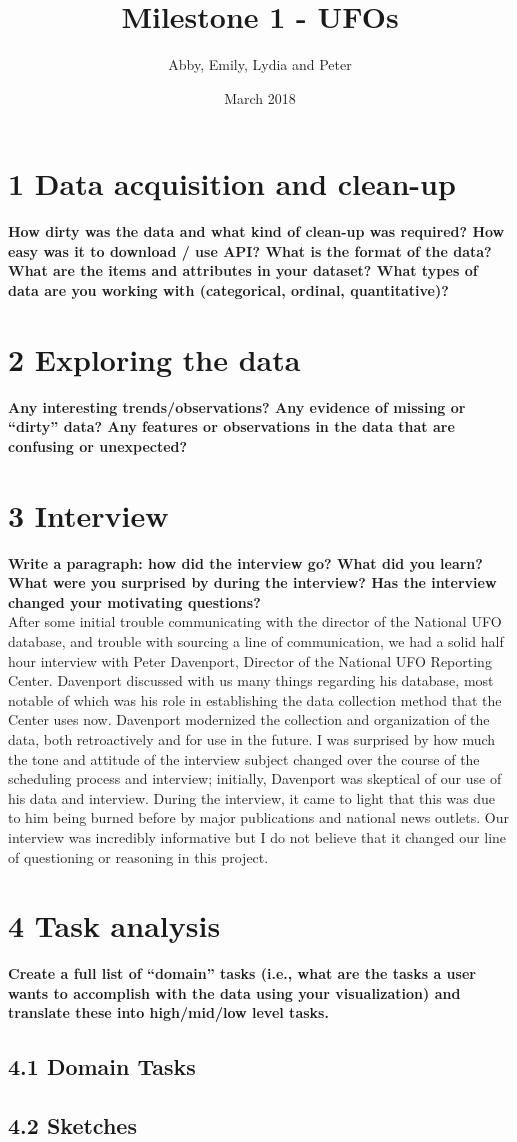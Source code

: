 \documentclass{neu_handout}
\title{Milestone 1 - UFOs}
\author{Abby, Emily, Lydia and Peter}
\date{March 2018}
\begin{document}
\section*{1 Data acquisition and clean-up}

\textbf{How dirty was the data and what kind of clean-up was required? How
easy was it to download / use API? What is the format of the data? What are the
items and attributes in your dataset? What types of data are you working with
(categorical, ordinal, quantitative)?}\\


\section*{2 Exploring the data}

\textbf{Any interesting
trends/observations? Any evidence of missing or “dirty” data? Any features or
observations in the data that are confusing or unexpected?}\\



\section*{3 Interview}

\textbf{Write a paragraph: how did the interview go? What did you learn? What were you surprised by during the interview? Has the interview changed your motivating questions?}\\ 

After some initial trouble communicating with the director of the National UFO database, and trouble with sourcing a line of communication, we had a solid half hour interview with Peter Davenport, Director of the National UFO Reporting Center. Davenport discussed with us many things regarding his database, most notable of which was his role in establishing the data collection method that the Center uses now. Davenport modernized the collection and organization of the data, both retroactively and for use in the future. I was surprised by how much the tone and attitude of the interview subject changed over the course of the scheduling process and interview; initially, Davenport was skeptical of our use of his data and interview. During the interview, it came to light that this was due to him being burned before by major publications and national news outlets. Our interview was incredibly informative but I do not believe that it changed our line of questioning or reasoning in this project. 




\section*{4 Task analysis}

\textbf{Create a full list of “domain” tasks (i.e., what are the tasks a
user wants to accomplish with the data using your visualization) and translate
these into high/mid/low level tasks.}

\subsection*{4.1 Domain Tasks}

\subsection*{4.2 Sketches}
\end{document}
